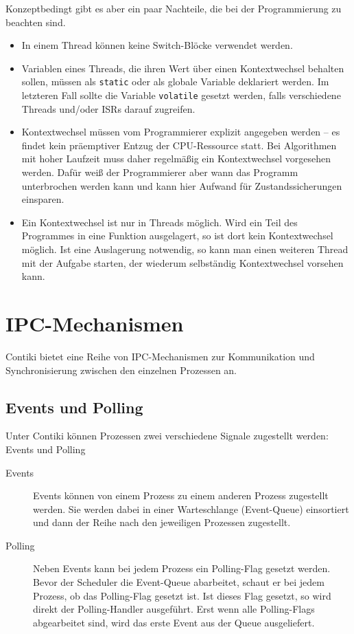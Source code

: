 	Konzeptbedingt gibt es aber ein paar Nachteile, die bei der
	Programmierung zu beachten sind.
	\begin{itemize}
	\item	In einem Thread können keine Switch-Blöcke verwendet
		werden.
	\item	Variablen eines Threads, die ihren Wert über einen
		Kontextwechsel behalten sollen, müssen als \lstinline=static=
		oder als globale Variable deklariert werden.  Im letzteren
		Fall sollte die Variable \lstinline=volatile= gesetzt werden,
		falls verschiedene Threads und/oder \acp{ISR}
		darauf zugreifen.
	\item	Kontextwechsel müssen vom Programmierer explizit angegeben
		werden -- es findet kein präemptiver Entzug der CPU-Ressource
		statt.
		Bei Algorithmen mit hoher Laufzeit muss daher regelmäßig ein
		Kontextwechsel vorgesehen werden.
		Dafür weiß der Programmierer aber wann das Programm unterbrochen
		werden kann und kann hier Aufwand für Zustandssicherungen
		einsparen.
	\item	Ein Kontextwechsel ist nur in Threads möglich.  Wird ein Teil
		des Programmes in eine Funktion ausgelagert, so ist dort kein
		Kontextwechsel möglich.  Ist eine Auslagerung notwendig,
		so kann man einen weiteren Thread mit der Aufgabe starten, der
		wiederum selbständig Kontextwechsel vorsehen kann.
	\end{itemize}



\section{IPC-Mechanismen}
	Contiki bietet eine Reihe von \acs{IPC}-Mechanismen zur Kommunikation und
	Synchronisierung zwischen den einzelnen Prozessen an.


\subsection{Events und Polling}
\label{sec:impl:events}
	Unter Contiki können Prozessen zwei verschiedene Signale zugestellt
	werden: Events und Polling
	\begin{description}
	\item[Events]
		Events können von einem Prozess zu einem anderen Prozess
		zugestellt werden.  Sie werden dabei in einer Warteschlange
		(Event-Queue) einsortiert und dann der Reihe nach den jeweiligen
		Prozessen zugestellt.
	\item[Polling]
		Neben Events kann bei jedem Prozess ein Polling-Flag gesetzt
		werden.  Bevor der Scheduler die Event-Queue abarbeitet,
		schaut er bei jedem Prozess, ob das Polling-Flag gesetzt ist.
		Ist dieses Flag gesetzt, so wird direkt der Polling-Handler
		ausgeführt.  Erst wenn alle Polling-Flags abgearbeitet sind,
		wird das erste Event aus der Queue ausgeliefert.
	\end{description}

